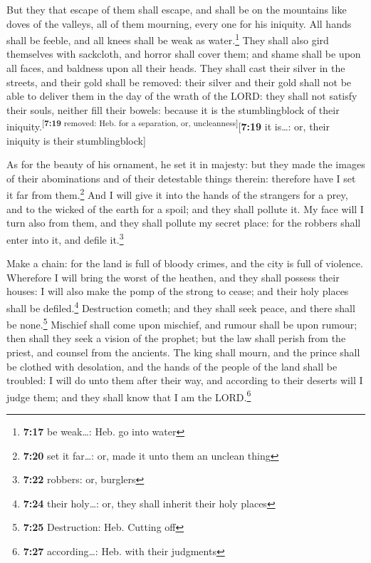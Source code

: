  But they that escape of them shall escape, and shall be
on the mountains like doves of the valleys, all of them mourning, every
one for his iniquity.  All hands shall be feeble, and all
knees shall be weak as water.\footnote{\textbf{7:17} be weak\ldots: Heb.
  go into water}  They shall also gird themselves with
sackcloth, and horror shall cover them; and shame shall be upon all
faces, and baldness upon all their heads.  They shall
cast their silver in the streets, and their gold shall be removed: their
silver and their gold shall not be able to deliver them in the day of
the wrath of the LORD: they shall not satisfy their souls, neither fill
their bowels: because it is the stumblingblock of their
iniquity.\textsuperscript{{[}\textbf{7:19} removed: Heb. for a
separation, or, uncleanness{]}}{[}\textbf{7:19} it is\ldots: or, their
iniquity is their stumblingblock{]}

 As for the beauty of his ornament, he set it in majesty:
but they made the images of their abominations and of their detestable
things therein: therefore have I set it far from them.\footnote{\textbf{7:20}
  set it far\ldots: or, made it unto them an unclean thing}
 And I will give it into the hands of the strangers for a
prey, and to the wicked of the earth for a spoil; and they shall pollute
it.  My face will I turn also from them, and they shall
pollute my secret place: for the robbers shall enter into it, and defile
it.\footnote{\textbf{7:22} robbers: or, burglers}

 Make a chain: for the land is full of bloody crimes, and
the city is full of violence.  Wherefore I will bring the
worst of the heathen, and they shall possess their houses: I will also
make the pomp of the strong to cease; and their holy places shall be
defiled.\footnote{\textbf{7:24} their holy\ldots: or, they shall inherit
  their holy places}  Destruction cometh; and they shall
seek peace, and there shall be none.\footnote{\textbf{7:25} Destruction:
  Heb. Cutting off}  Mischief shall come upon mischief,
and rumour shall be upon rumour; then shall they seek a vision of the
prophet; but the law shall perish from the priest, and counsel from the
ancients.  The king shall mourn, and the prince shall be
clothed with desolation, and the hands of the people of the land shall
be troubled: I will do unto them after their way, and according to their
deserts will I judge them; and they shall know that I am the
LORD.\footnote{\textbf{7:27} according\ldots: Heb. with their judgments}

